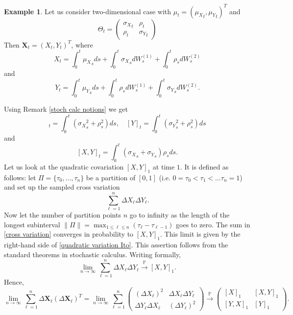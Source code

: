 \documentclass[a4paper,11pt]{article}
\theoremstyle{plain}
\theoremstyle{definition}
\newtheorem{exmp}[thm]{Example}
\begin{document}
	\begin{exmp} \label{quad var}
		Let us consider two-dimensional case with $\mu_t = ({\mu_X}_t, {\mu_Y}_t)^T$ and
		\[\Theta_t = \begin{pmatrix}
		{\sigma_X}_t & \rho_t \\
		\rho_t & {\sigma_Y}_t
		\end{pmatrix} \]
		Then $\mathbf{X}_t = (X_t, Y_t)^T$, where 
		\[X_t = \int_0^t{\mu_X}_s ds + \int_0^t{\sigma_X}_s dW_s^{(1)} + \int_0^t\rho_s dW_s^{(2)}\] 
		and
		\[Y_t = \int_0^t{\mu_Y}_s ds + \int_0^t\rho_s dW_s^{(1)} + \int_0^t{\sigma_Y}_s dW_s^{(2)}.\]
		
		Using Remark \ref{stoch calc notions} we get
		\begin{equation}
			[X]_t = \int_{0}^{t}({\sigma_X}_s^2 + \rho_s^2) ds, \quad  [Y]_t = \int_{0}^{t}({\sigma_Y}_s^2 + \rho_s^2) ds
		\end{equation}
		and
		\begin{equation} \label{quadratic variation Ito}
         	[X, Y]_t = \int_{0}^{t}({\sigma_X}_s + {\sigma_Y}_s)\rho_s ds. 
		\end{equation}
		Let us look at the quadratic covariation $[X, Y]_1$ at time $1$. It is defined as follows: let $\Pi = \{ \tau_0, \dots, \tau_n \}$ be a partition of $[0, 1]$ (i.e. $0 = \tau_0 < \tau_1 < \dots \tau_n = 1$) and set up the sampled cross variation
		\begin{equation} \label{cross variation}
			\sum_{\ell = 1}^{n} \Delta X_\ell \Delta Y_\ell.
		\end{equation}
		Now let the number of partition points $n$ go to infinity as the length of the longest subinterval $\| \Pi \| = \max_{1 \leq \ell \leq n}(\tau_{\ell} - \tau_{\ell-1}) $ goes to zero. The sum in \eqref{cross variation} converges in probability to $[X, Y]_1$. This limit is given by the right-hand side of \eqref{quadratic variation Ito}. This assertion follows from the standard theorems in stochastic calculus. Writing formally,
		\[  \lim_{n \rightarrow \infty} \sum_{\ell = 1}^{n} \Delta X_\ell \Delta Y_\ell \xrightarrow{\mathbb{P}} [X, Y]_1. \]
		Hence,
		\[
		\lim_{n \rightarrow \infty} \sum_{\ell=1}^{n}\Delta \mathbf{X}_\ell(\Delta \mathbf{X}_\ell)^T
		= \lim_{n \rightarrow \infty} \sum_{\ell=1}^{n}\begin{pmatrix}
		(\Delta X_\ell)^2 & \Delta X_\ell \Delta Y_\ell \\
		\Delta Y_\ell \Delta X_\ell & (\Delta Y_\ell)^2
		\end{pmatrix} 
		\xrightarrow{\mathbb{P}} 
		\begin{pmatrix}
		[X]_1 & [X, Y]_1 \\
		[Y, X]_1 & [Y]_1
		\end{pmatrix}.
		 \]
		

\end{exmp}
\end{document}
